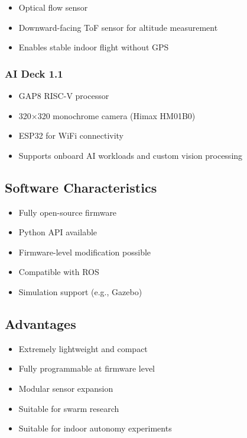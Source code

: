 \documentclass[a4paper]{article}
\begin{document}
            \begin{itemize}
                \item Optical flow sensor
                \item Downward-facing ToF sensor for altitude measurement
                \item Enables stable indoor flight without GPS
                \end{itemize}
            
            \subsubsection{AI Deck 1.1}
            
            \begin{itemize}
                \item GAP8 RISC-V processor
                \item 320×320 monochrome camera (Himax HM01B0)
                \item ESP32 for WiFi connectivity
                \item Supports onboard AI workloads and custom vision processing
                \end{itemize}
        
        \subsection{Software Characteristics}
            
            \begin{itemize}
                \item Fully open-source firmware
                \item Python API available
                \item Firmware-level modification possible
                \item Compatible with ROS
                \item Simulation support (e.g., Gazebo)
            \end{itemize}
        
        \subsection{Advantages}
            
            \begin{itemize}
                \item Extremely lightweight and compact
                \item Fully programmable at firmware level
                \item Modular sensor expansion
                \item Suitable for swarm research
                \item Suitable for indoor autonomy experiments
            \end{itemize}
        
\end{document}
